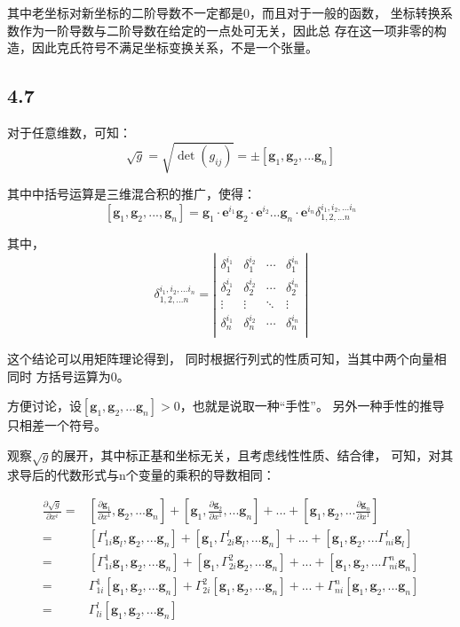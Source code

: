 \documentclass[UTF8,zihao=5]{ctexart}
\newcommand{\bm}[1]{{\mathbf{#1}}}
\newcommand*{\pd}[2]{\frac{\partial #1}{\partial #2}}
\begin{document}
其中老坐标对新坐标的二阶导数不一定都是0，而且对于一般的函数，
坐标转换系数作为一阶导数与二阶导数在给定的一点处可无关，因此总
存在这一项非零的构造，因此克氏符号不满足坐标变换关系，不是一个张量。

\subsection*{4.7}

对于任意维数，可知：
$$
    \sqrt{g}=\sqrt{\det(g_{ij})}=\pm[\bm{g}_1,\bm{g}_2,...\bm{g}_n]
$$

其中中括号运算是三维混合积的推广，使得：
$$
    [\bm{g}_1,\bm{g}_2,...,\bm{g}_n]
    =\bm{g}_1\cdot \bm{e}^{i_1}
    \bm{g}_2\cdot \bm{e}^{i_2}...
    \bm{g}_n\cdot \bm{e}^{i_n}
    \delta_{1,2,...n}^{i_1,i_2,...i_n}
$$

其中，
$$
    \delta_{1,2,...n}^{i_1,i_2,...i_n}
    =
    \left|\begin{matrix}
        \delta_1^{i_1} & \delta_1^{i_2} & \cdots & \delta_1^{i_n} \\
        \delta_2^{i_1} & \delta_2^{i_2} & \cdots & \delta_2^{i_n} \\
        \vdots         & \vdots         & \ddots & \vdots         \\
        \delta_n^{i_1} & \delta_n^{i_2} & \cdots & \delta_n^{i_n} \\
    \end{matrix}\right|
$$

这个结论可以用矩阵理论得到，
同时根据行列式的性质可知，当其中两个向量相同时
方括号运算为0。

方便讨论，设$[\bm{g}_1,\bm{g}_2,...\bm{g}_n]>0$，也就是说取一种“手性”。
另外一种手性的推导只相差一个符号。

观察$\sqrt{g}$的展开，其中标正基和坐标无关，且考虑线性性质、结合律，
可知，对其求导后的代数形式与n个变量的乘积的导数相同：

$$
    \begin{aligned}
        \pd{\sqrt{g}}{x^i}= &
        [\pd{\bm{g}_1}{x^1}, \bm{g}_2,...\bm{g}_n]
        +[\bm{g}_1, \pd{\bm{g}_2}{x^1},...\bm{g}_n]+...
        +[\bm{g}_1, \bm{g}_2,...\pd{\bm{g}_n}{x^1}]    \\
        =                   &
        [\Gamma^l_{1i}\bm{g}_l, \bm{g}_2,...\bm{g}_n]
        +[\bm{g}_1, \Gamma^l_{2i}\bm{g}_l,...\bm{g}_n]+...
        +[\bm{g}_1, \bm{g}_2,...\Gamma^l_{ni}\bm{g}_l] \\
        =                   &
        [\Gamma^1_{1i}\bm{g}_1, \bm{g}_2,...\bm{g}_n]
        +[\bm{g}_1, \Gamma^2_{2i}\bm{g}_2,...\bm{g}_n]+...
        +[\bm{g}_1, \bm{g}_2,...\Gamma^n_{ni}\bm{g}_n]\\
        =                   &
        \Gamma^1_{1i}[\bm{g}_1, \bm{g}_2,...\bm{g}_n]
        +\Gamma^2_{2i}[\bm{g}_1, \bm{g}_2,...\bm{g}_n]+...
        +\Gamma^n_{ni}[\bm{g}_1, \bm{g}_2,...\bm{g}_n]\\
        =                   &
        \Gamma^l_{li}[\bm{g}_1, \bm{g}_2,...\bm{g}_n]
    \end{aligned}
$$
\end{document}
